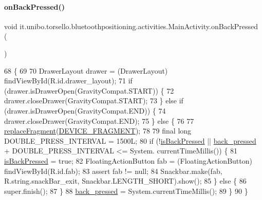 \paragraph{\texorpdfstring{on\+Back\+Pressed()}{onBackPressed()}}
{\footnotesize\ttfamily void it.\+unibo.\+torsello.\+bluetoothpositioning.\+activities.\+Main\+Activity.\+on\+Back\+Pressed (\begin{DoxyParamCaption}{ }\end{DoxyParamCaption})}


\begin{DoxyCode}
68                                 \{
69 
70         DrawerLayout drawer = (DrawerLayout) findViewById(R.id.drawer\_layout);
71         \textcolor{keywordflow}{if} (drawer.isDrawerOpen(GravityCompat.START)) \{
72             drawer.closeDrawer(GravityCompat.START);
73         \} \textcolor{keywordflow}{else} \textcolor{keywordflow}{if} (drawer.isDrawerOpen(GravityCompat.END)) \{
74             drawer.closeDrawer(GravityCompat.END);
75         \} \textcolor{keywordflow}{else} \{
76 
77             \hyperlink{classit_1_1unibo_1_1torsello_1_1bluetoothpositioning_1_1activities_1_1MainActivity_a98db4478d28cd91118138d0b652ceb2c_a98db4478d28cd91118138d0b652ceb2c}{replaceFragment}(\hyperlink{classit_1_1unibo_1_1torsello_1_1bluetoothpositioning_1_1activities_1_1MainActivity_a2f77c0245ac2525dc58905e38e1817d1_a2f77c0245ac2525dc58905e38e1817d1}{DEVICE\_FRAGMENT});
78 
79             \textcolor{keyword}{final} \textcolor{keywordtype}{long} DOUBLE\_PRESS\_INTERVAL = 1500L;
80             \textcolor{keywordflow}{if} (!\hyperlink{classit_1_1unibo_1_1torsello_1_1bluetoothpositioning_1_1activities_1_1MainActivity_a73d74411ec7bb55eb827bb81018174bd_a73d74411ec7bb55eb827bb81018174bd}{isBackPressed} || \hyperlink{classit_1_1unibo_1_1torsello_1_1bluetoothpositioning_1_1activities_1_1MainActivity_a5e1ae38b2bbdcc45f2164fdc393ca495_a5e1ae38b2bbdcc45f2164fdc393ca495}{back\_pressed} + DOUBLE\_PRESS\_INTERVAL <= System.
      currentTimeMillis()) \{
81                 \hyperlink{classit_1_1unibo_1_1torsello_1_1bluetoothpositioning_1_1activities_1_1MainActivity_a73d74411ec7bb55eb827bb81018174bd_a73d74411ec7bb55eb827bb81018174bd}{isBackPressed} = \textcolor{keyword}{true};
82                 FloatingActionButton fab = (FloatingActionButton) findViewById(R.id.fab);
83                 assert fab != null;
84                 Snackbar.make(fab, R.string.snackBar\_exit, Snackbar.LENGTH\_SHORT).show();
85             \} \textcolor{keywordflow}{else} \{
86                 super.finish();
87             \}
88             \hyperlink{classit_1_1unibo_1_1torsello_1_1bluetoothpositioning_1_1activities_1_1MainActivity_a5e1ae38b2bbdcc45f2164fdc393ca495_a5e1ae38b2bbdcc45f2164fdc393ca495}{back\_pressed} = System.currentTimeMillis();
89         \}
90     \}
\end{DoxyCode}
